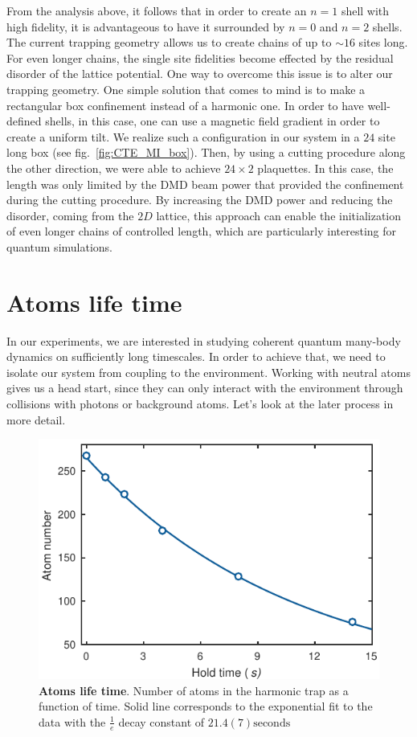 From the analysis above, it follows that in order to create an $n=1$ shell with high fidelity, it is advantageous to have it surrounded by $n=0$ and $n=2$ shells. The current trapping geometry allows us to create chains of up to $\sim 16$ sites long. For even longer chains, the single site fidelities become effected by the residual disorder of the lattice potential. One way to overcome this issue is to alter our trapping geometry. One simple solution that comes to mind is to make a rectangular box confinement instead of a harmonic one. In order to have well-defined shells, in this case, one can use a magnetic field gradient in order to create a uniform tilt. We realize such a configuration in our system in a $24$ site long box (see fig.~\ref{fig:CTE_MI_box}). Then, by using a cutting procedure along the other direction, we were able to achieve $24\times 2$ plaquettes. In this case, the length was only limited by the DMD beam power that provided the confinement during the cutting procedure. By increasing the DMD power and reducing the disorder, coming from the $2D$ lattice, this approach can enable the initialization of even longer chains of controlled length, which are particularly interesting for quantum simulations.

\section{Atoms life time}
In our experiments, we are interested in studying coherent quantum many-body dynamics on sufficiently long timescales. In order to achieve that, we need to isolate our system from coupling to the environment. Working with neutral atoms gives us a head start, since they can only interact with the environment through collisions with photons or background atoms. Let's look at the later process in more detail.

\begin{figure}[t]
	\centering
	\includegraphics[scale=1]{figures/CTE_lifetime.pdf}
	\caption{{\bf Atoms life time}. Number of atoms in the harmonic trap as  a function of time. Solid line corresponds to the exponential fit to the data with the $\frac{1}{e}$ decay constant of $21.4(7) \mathrm{seconds}$}
	\label{fig:CTE_liefetime}
\end{figure}

